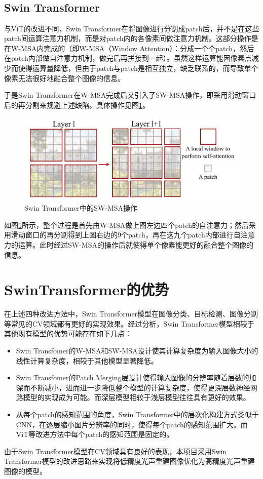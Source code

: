 \hspace*{\fill} \

\hspace*{\fill} \

\hspace*{\fill} \

\hspace*{\fill} \

\subsection{Swin Transformer}
与ViT的改进不同，Swin Transformer在将图像进行分割成patch后，并不是在这些patch间运算注意力机制，而是对patch内的各像素间做注意力机制。这部分操作是在W-MSA内完成的（即W-MSA（Window Attention）：分成一个个patch，然后在patch内部做自注意力机制，做完后再拼接到一起）。虽然这样运算能因像素点减少而使得运算量降低，但由于patch与patch是相互独立，缺乏联系的，而导致单个像素无法很好地融合整个图像的信息。

于是Swin Transformer在W-MSA完成后又引入了SW-MSA操作，即采用滑动窗口后的再分割来规避上述缺陷。具体操作见图\ref{img315}。

 \begin{figure}[h]
	\centering
	\includegraphics[width=0.75\columnwidth]{image/chap03/img315.png}
	\caption{Swin Transformer中的SW-MSA操作\cite{liu2021swin}}
	\label{img315}
\end{figure}
 
 如图\ref{img315}所示，整个过程是首先由W-MSA做上图左边四个patch的自注意力；然后采用滑动窗口的再分割得到上图右边的9个patch，再在这九个patch内部进行自注意力的运算。此时经过SW-MSA的操作后就使得单个像素能更好的融合整个图像的信息。
 
 \section{SwinTransformer的优势}
 在上述四种改进方法中，Swin Transformer模型在图像分类、目标检测、图像分割等常见的CV领域都有更好的实现效果。经过分析，Swin Transformer模型相较于其他现有模型的优势可能存在如下几点：
 
 \begin{itemize}
 	\item [1)]
 	Swin Transfomer的W-MSA和SW-MSA设计使其计算复杂度为输入图像大小的线性计算复杂度，相较于其他模型显著降低。
 	\item [2)]
 	Swin Transfomer的Patch Merging层设计使得输入图像的分辨率随着层数的加深而不断减小，进而进一步降低整个模型的计算复杂度，使得更深层数神经网路模型的实现成为可能。而深层模型相较于浅层模型往往具有更好的效果。
 	\item [3)]
 	从每个patch的感知范围的角度，Swin Transformer中的层次化构建方式类似于CNN，在逐层缩小图片分辨率的同时，使得每个patch的感知范围扩大。而ViT等改进方法中每个patch的感知范围是固定的。
 \end{itemize}

由于Swin Transformer模型在CV领域具有良好的表现，本项目采用Swin Transformer模型的改进思路来实现将低精度光声重建图像优化为高精度光声重建图像的模型。
